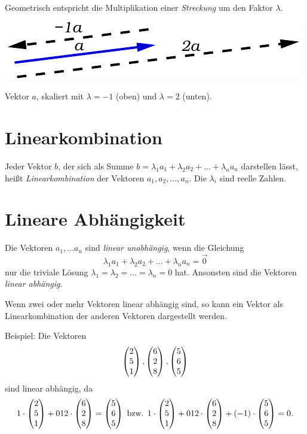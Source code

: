 			Geometrisch entspricht die Multiplikation einer \emph{Streckung} um den
			Faktor $\lambda$.
			
			\begin{center}
				\includegraphics[width=.4\textwidth]{img/vektor_mult.pdf}
				
				{\scriptsize Vektor $a$, skaliert mit $\lambda = -1$ (oben) und $\lambda = 2$
				(unten).}
			\end{center}
	
	\section{Linearkombination}
		
		Jeder Vektor $b$, der sich als Summe $b = \lambda_1 a_1 + \lambda_2 a_2 +
		\dots + \lambda_n a_n$ darstellen lässt, heißt \emph{Linearkombination} der
		Vektoren $a_1, a_2, \dots, a_n$. Die $\lambda_i$ sind reelle Zahlen.
		
	\section{Lineare Abhängigkeit}
	
		Die Vektoren $a_1, \dots a_n$ sind \emph{linear unabhängig}, wenn die
		Gleichung 
		\[\lambda_1 a_1 + \lambda_2 a_2 + \dots + \lambda_n a_n = \overrightarrow 0\]
		nur die triviale Lösung $\lambda_1 = \lambda_2 = \dots = \lambda_n = 0$ hat. Ansonsten
		sind die Vektoren \emph{linear abhängig}.
		
		\noindent Wenn zwei oder mehr Vektoren linear abhängig sind, so kann ein Vektor als
		Linearkombination der anderen Vektoren dargestellt werden.
		
		\noindent Beispiel:
		Die Vektoren \[\mvect{2\\5\\1},\mvect{6\\2\\8},\mvect{5\\6\\5}\] sind linear
		abhängig, da \[1 \cdot \mvect{2\\5\\1} + \frac{1}{2} \cdot \mvect{6\\2\\8} =
		\mvect{5\\6\\5} \text{ bzw. } 1 \cdot \mvect{2\\5\\1} + \frac{1}{2} \cdot
		\mvect{6\\2\\8} + (-1) \cdot \mvect{5\\6\\5} = 0.\]
		
